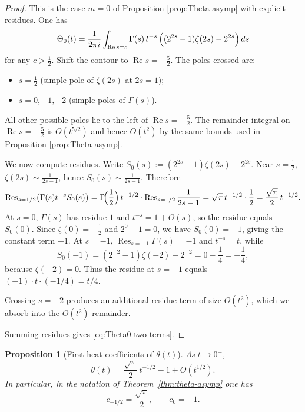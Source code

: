 \documentclass[11pt,letterpaper]{amsart}
\numberwithin{equation}{section}
\newtheorem{proposition}[theorem]{Proposition}
\theoremstyle{definition}
\newcommand{\Ree}{\operatorname{Re}}
\begin{document}
\begin{proof}
This is the case $m=0$ of Proposition \ref{prop:Theta-asymp} with explicit residues. One has
\[
\Theta_0(t)=\frac{1}{2\pi i}\int_{\Ree s=c}\Gamma(s)\,t^{-s}\,
\Bigl((2^{2s}-1)\zeta(2s)-2^{2s}\Bigr)\,ds
\]
for any $c>\tfrac12$.
Shift the contour to $\Ree s=-\tfrac52$.
The poles crossed are:
\begin{itemize}[leftmargin=2.5em]
\item $s=\tfrac12$ (simple pole of $\zeta(2s)$ at $2s=1$);
\item $s=0,-1,-2$ (simple poles of $\Gamma(s)$).
\end{itemize}
All other possible poles lie to the left of $\Ree s=-\tfrac52$.
The remainder integral on $\Ree s=-\tfrac52$ is $O(t^{5/2})$ and hence $O(t^2)$
by the same bounds used in Proposition \ref{prop:Theta-asymp}.

We now compute residues.
Write $S_0(s):=(2^{2s}-1)\zeta(2s)-2^{2s}$.
Near $s=\tfrac12$, $\zeta(2s)\sim \frac{1}{2s-1}$, hence $S_0(s)\sim \frac{1}{2s-1}$.
Therefore
\[
\operatorname{Res}_{s=1/2}\bigl(\Gamma(s)t^{-s}S_0(s)\bigr)
=\Gamma\!\Bigl(\frac12\Bigr)\,t^{-1/2}\cdot \operatorname{Res}_{s=1/2}\frac{1}{2s-1}
=\sqrt{\pi}\,t^{-1/2}\cdot \frac12=\frac{\sqrt{\pi}}{2}\,t^{-1/2}.
\]
At $s=0$, $\Gamma(s)$ has residue $1$ and $t^{-s}=1+O(s)$, so the residue equals $S_0(0)$.
Since $\zeta(0)=-\tfrac12$ and $2^{0}-1=0$, we have $S_0(0)=-1$, giving the constant term $-1$.
At $s=-1$, $\operatorname{Res}_{s=-1}\Gamma(s)=-1$ and $t^{-s}=t$, while
\[
S_0(-1)=(2^{-2}-1)\zeta(-2)-2^{-2}=0-\frac14=-\frac14,
\]
because $\zeta(-2)=0$.
Thus the residue at $s=-1$ equals $(-1)\cdot t\cdot (-1/4)=t/4$.

Crossing $s=-2$ produces an additional residue term of size $O(t^2)$, which we absorb into the $O(t^2)$ remainder.

Summing residues gives \eqref{eq:Theta0-two-terms}.
\end{proof}

\begin{proposition}[First heat coefficients of $\theta(t)$]\label{prop:first-heat-coeffs}
As $t\to 0^+$,
\begin{equation}\label{eq:theta-first-coeffs}
\theta(t)=\frac{\sqrt{\pi}}{2}\,t^{-1/2}-1+O(t^{1/2}).
\end{equation}
In particular, in the notation of Theorem~\ref{thm:theta-asymp} one has
\[
c_{-1/2}=\frac{\sqrt{\pi}}{2},
\qquad
c_0=-1.
\]
\end{proposition}
\end{document}
